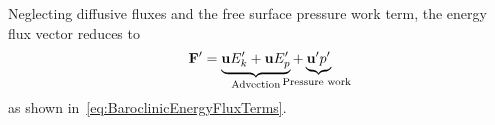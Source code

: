 \documentclass{ametsocV6.1}
\begin{document}
Neglecting diffusive fluxes and the free surface pressure work term, the energy flux vector reduces to
\begin{equation}
\mathbf{F'} = \underbrace{\mathbf{u}E'_k + \mathbf{u}E'_p}_\text{Advection} + \underbrace{\mathbf{u^\prime}p^\prime}_{\text{\makebox[0pt]{Pressure work} }}
\label{eq:BaroclinicEnergyFluxTermsAppendix}
\end{equation}
as shown in~\eqref{eq:BaroclinicEnergyFluxTerms}.




\end{document}
